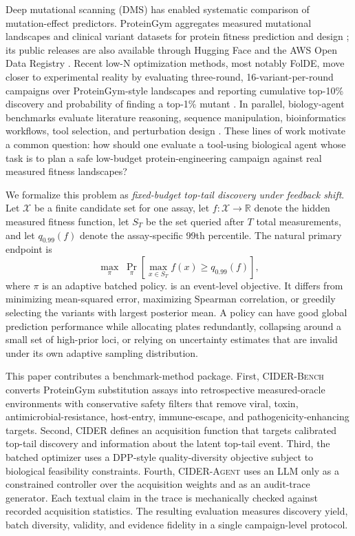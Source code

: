 \documentclass{article}
\newcommand{\method}{\textsc{CIDER}}
\newcommand{\bench}{\textsc{CIDER-Bench}}
\newcommand{\agent}{\textsc{CIDER-Agent}}
\newcommand{\topone}{top-1\%}
\newcommand{\topten}{top-10\%}
\newcommand{\dms}{DMS}
\newcommand{\xset}{\mathcal X}
\newcommand{\R}{\mathbb R}
\begin{document}
Deep mutational scanning (\dms) has enabled systematic comparison of mutation-effect predictors. ProteinGym aggregates measured mutational landscapes and clinical variant datasets for protein fitness prediction and design \citep{notin2023proteingym}; its public releases are also available through Hugging Face and the AWS Open Data Registry \citep{proteingymhf,proteingymaws}. Recent low-N optimization methods, most notably FolDE, move closer to experimental reality by evaluating three-round, 16-variant-per-round campaigns over ProteinGym-style landscapes and reporting cumulative \topten{} discovery and probability of finding a \topone{} mutant \citep{roberts2025folde}. In parallel, biology-agent benchmarks evaluate literature reasoning, sequence manipulation, bioinformatics workflows, tool selection, and perturbation design \citep{laurent2024labbench,mitchener2025bixbench,roohani2024biodiscovery,able2025}. These lines of work motivate a common question: how should one evaluate a tool-using biological agent whose task is to plan a safe low-budget protein-engineering campaign against real measured fitness landscapes?

We formalize this problem as \emph{fixed-budget top-tail discovery under feedback shift}. Let $\xset$ be a finite candidate set for one assay, let $f:\xset\to\R$ denote the hidden measured fitness function, let $S_T$ be the set queried after $T$ total measurements, and let $q_{0.99}(f)$ denote the assay-specific 99th percentile. The natural primary endpoint is
\begin{equation}
\label{eq:objective}
\max_{\pi}\;\Pr_{\pi}\!\left[\max_{x\in S_T} f(x)\ge q_{0.99}(f)\right],
\end{equation}
where $\pi$ is an adaptive batched policy.  is an event-level objective. It differs from minimizing mean-squared error, maximizing Spearman correlation, or greedily selecting the variants with largest posterior mean. A policy can have good global prediction performance while allocating plates redundantly, collapsing around a small set of high-prior loci, or relying on uncertainty estimates that are invalid under its own adaptive sampling distribution.

This paper contributes a benchmark-method package. First, \bench{} converts ProteinGym substitution assays into retrospective measured-oracle environments with conservative safety filters that remove viral, toxin, antimicrobial-resistance, host-entry, immune-escape, and pathogenicity-enhancing targets. Second, \method{} defines an acquisition function that targets calibrated top-tail discovery and information about the latent top-tail event. Third, the batched optimizer uses a DPP-style quality-diversity objective subject to biological feasibility constraints. Fourth, \agent{} uses an LLM only as a constrained controller over the acquisition weights and as an audit-trace generator. Each textual claim in the trace is mechanically checked against recorded acquisition statistics. The resulting evaluation measures discovery yield, batch diversity, validity, and evidence fidelity in a single campaign-level protocol.
\end{document}
